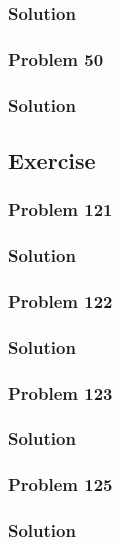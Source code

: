 \documentclass[journal,12pt,twocolumn]{IEEEtran}
\begin{document}
\subsubsection{Solution}



\subsubsection{Problem 50}

%
\subsubsection{Solution}



\subsection{Exercise}
\subsubsection{Problem 121}

%
\subsubsection{Solution}

%
\subsubsection{Problem 122}

%
\subsubsection{Solution}

%
\subsubsection{Problem 123}

%
\subsubsection{Solution}

%
\subsubsection{Problem 125}

%
\subsubsection{Solution}

\end{document}
